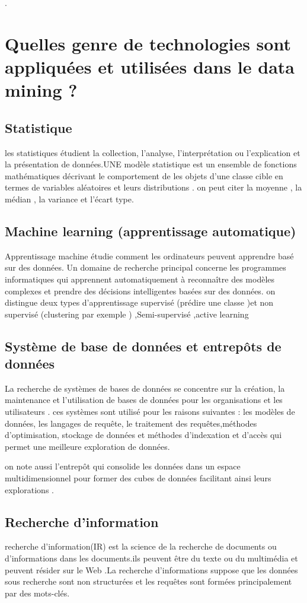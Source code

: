 \documentclass[12pt,a4paper,oneside]{book}
\begin{document}
.
    \section{Quelles genre de technologies sont appliquées et utilisées dans le data mining ?}
    \subsection{Statistique}
    les statistiques étudient la collection, l'analyse, l'interprétation ou l'explication et la présentation de données.UNE modèle statistique est un ensemble de fonctions mathématiques décrivant le comportement de les objets d'une classe cible en termes de variables aléatoires et leurs distributions . on peut citer la moyenne , la médian , la variance et l'écart type.
    
    \subsection{Machine learning (apprentissage automatique)}
    Apprentissage machine étudie comment les ordinateurs peuvent apprendre basé sur des données.
    Un domaine de recherche principal concerne les programmes informatiques qui apprennent automatiquement  à reconnaître des modèles complexes et prendre des décisions intelligentes basées sur des données. 
    on distingue deux types d'apprentissage supervisé (prédire une classe )et non supervisé (clustering par exemple ) ,Semi-supervisé ,active learning 
    \subsection{Système de base de données et entrepôts de données}
    La recherche de systèmes de bases de données se concentre sur la création, la maintenance et l'utilisation de bases de données pour les organisations et les utilisateurs .
    ces systèmes sont utilisé pour les raisons suivantes :
    les modèles de données, les langages de requête, le traitement des requêtes,méthodes d’optimisation, stockage de données et méthodes d’indexation et d’accès qui permet une meilleure exploration de données.
    
    on note aussi  l'entrepôt qui consolide
    les données dans un espace multidimensionnel pour former des cubes de données facilitant ainsi leurs explorations .
    
    \subsection{Recherche d'information}
    recherche d'information(IR) est la science de la recherche de documents ou d'informations dans les documents.ils peuvent être du texte ou du multimédia et peuvent résider sur le Web .La recherche d'informations suppose que  les données sous recherche sont non structurées et les requêtes sont formées principalement par des mots-clés.
    
\end{document}

